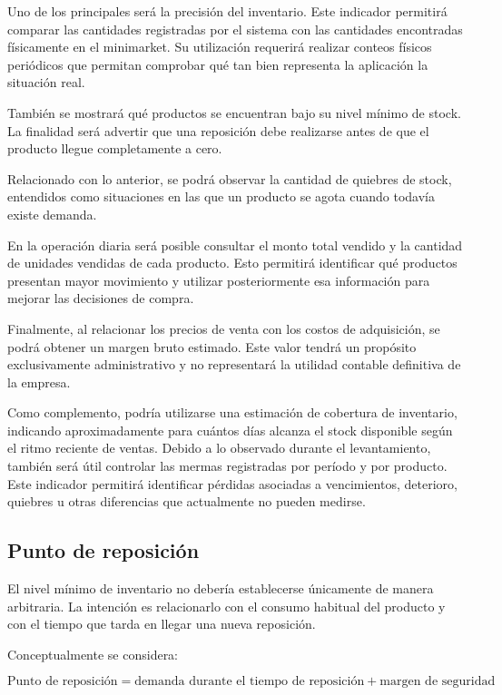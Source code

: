 \documentclass[10pt,a4paper]{article}
\begin{document}
Uno de los principales será la precisión del inventario. Este indicador permitirá comparar las cantidades registradas por el sistema con las cantidades encontradas físicamente en el minimarket. Su utilización requerirá realizar conteos físicos periódicos que permitan comprobar qué tan bien representa la aplicación la situación real.

También se mostrará qué productos se encuentran bajo su nivel mínimo de stock. La finalidad será advertir que una reposición debe realizarse antes de que el producto llegue completamente a cero.

Relacionado con lo anterior, se podrá observar la cantidad de quiebres de stock, entendidos como situaciones en las que un producto se agota cuando todavía existe demanda.

En la operación diaria será posible consultar el monto total vendido y la cantidad de unidades vendidas de cada producto. Esto permitirá identificar qué productos presentan mayor movimiento y utilizar posteriormente esa información para mejorar las decisiones de compra.

Finalmente, al relacionar los precios de venta con los costos de adquisición, se podrá obtener un margen bruto estimado. Este valor tendrá un propósito exclusivamente administrativo y no representará la utilidad contable definitiva de la empresa.

Como complemento, podría utilizarse una estimación de cobertura de inventario, indicando aproximadamente para cuántos días alcanza el stock disponible según el ritmo reciente de ventas.
Debido a lo observado durante el levantamiento, también será útil controlar las mermas registradas por
período y por producto. Este indicador permitirá identificar pérdidas asociadas a vencimientos, deterioro,
quiebres u otras diferencias que actualmente no pueden medirse.


\subsection{Punto de reposición}

El nivel mínimo de inventario no debería establecerse únicamente de manera arbitraria. La intención es relacionarlo con el consumo habitual del producto y con el tiempo que tarda en llegar una nueva reposición.

Conceptualmente se considera:

\begin{equation}
\text{Punto de reposición}
=
\text{demanda durante el tiempo de reposición}
+
\text{margen de seguridad}
\end{equation}
\end{document}

